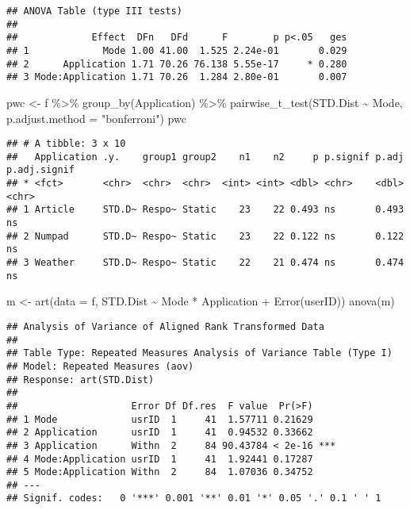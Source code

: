 \documentclass[
]{article}
\newenvironment{Shaded}{\begin{snugshade}}{\end{snugshade}}
\newcommand{\AttributeTok}[1]{\textcolor[rgb]{0.77,0.63,0.00}{#1}}
\newcommand{\FunctionTok}[1]{\textcolor[rgb]{0.00,0.00,0.00}{#1}}
\newcommand{\NormalTok}[1]{#1}
\newcommand{\OtherTok}[1]{\textcolor[rgb]{0.56,0.35,0.01}{#1}}
\newcommand{\SpecialCharTok}[1]{\textcolor[rgb]{0.00,0.00,0.00}{#1}}
\newcommand{\StringTok}[1]{\textcolor[rgb]{0.31,0.60,0.02}{#1}}
\begin{document}
\begin{verbatim}
## ANOVA Table (type III tests)
## 
##             Effect  DFn   DFd      F        p p<.05   ges
## 1             Mode 1.00 41.00  1.525 2.24e-01       0.029
## 2      Application 1.71 70.26 76.138 5.55e-17     * 0.280
## 3 Mode:Application 1.71 70.26  1.284 2.80e-01       0.007
\end{verbatim}

\begin{Shaded}
\begin{Highlighting}[]
\NormalTok{pwc }\OtherTok{\textless{}{-}}\NormalTok{ f }\SpecialCharTok{\%\textgreater{}\%} \FunctionTok{group\_by}\NormalTok{(Application) }\SpecialCharTok{\%\textgreater{}\%} \FunctionTok{pairwise\_t\_test}\NormalTok{(STD.Dist }\SpecialCharTok{\textasciitilde{}}\NormalTok{ Mode, }\AttributeTok{p.adjust.method =} \StringTok{"bonferroni"}\NormalTok{)}
\NormalTok{pwc}
\end{Highlighting}
\end{Shaded}

\begin{verbatim}
## # A tibble: 3 x 10
##   Application .y.    group1 group2    n1    n2     p p.signif p.adj p.adj.signif
## * <fct>       <chr>  <chr>  <chr>  <int> <int> <dbl> <chr>    <dbl> <chr>       
## 1 Article     STD.D~ Respo~ Static    23    22 0.493 ns       0.493 ns          
## 2 Numpad      STD.D~ Respo~ Static    23    22 0.122 ns       0.122 ns          
## 3 Weather     STD.D~ Respo~ Static    22    21 0.474 ns       0.474 ns
\end{verbatim}

\begin{Shaded}
\begin{Highlighting}[]
\NormalTok{m }\OtherTok{\textless{}{-}} \FunctionTok{art}\NormalTok{(}\AttributeTok{data =}\NormalTok{ f, STD.Dist }\SpecialCharTok{\textasciitilde{}}\NormalTok{ Mode }\SpecialCharTok{*}\NormalTok{ Application }\SpecialCharTok{+} \FunctionTok{Error}\NormalTok{(userID))}
\FunctionTok{anova}\NormalTok{(m)}
\end{Highlighting}
\end{Shaded}

\begin{verbatim}
## Analysis of Variance of Aligned Rank Transformed Data
## 
## Table Type: Repeated Measures Analysis of Variance Table (Type I) 
## Model: Repeated Measures (aov)
## Response: art(STD.Dist)
## 
##                    Error Df Df.res  F value  Pr(>F)    
## 1 Mode             usrID  1     41  1.57711 0.21629    
## 2 Application      usrID  1     41  0.94532 0.33662    
## 3 Application      Withn  2     84 90.43784 < 2e-16 ***
## 4 Mode:Application usrID  1     41  1.92441 0.17287    
## 5 Mode:Application Withn  2     84  1.07036 0.34752    
## ---
## Signif. codes:   0 '***' 0.001 '**' 0.01 '*' 0.05 '.' 0.1 ' ' 1
\end{verbatim}
\end{document}
